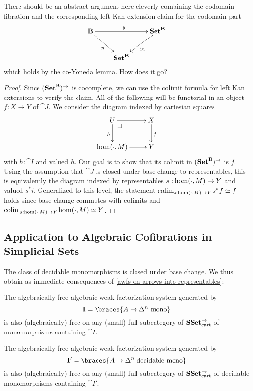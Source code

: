 \documentclass[reqno,10pt,a4paper,oneside]{amsart}
\begin{document}
\begin{question}
There should be an abstract argument here cleverly combining the codomain fibration and the corresponding left Kan extension claim for the codomain part
\[
\xymatrix{
  \cat{B}
  \ar[rr]^{y}
  \ar[dr]_{y}
&&
  \Set^{\cat{B}}
  \ar[dl]^{\id}
\\&
  \Set^{\cat{B}}
}
\]
which holds by the co-Yoneda lemma.
How does it go?
\end{question}

\begin{proof}
Since $(\mathbf{Set}^{\mathbf{B}})^{\to}$ is cocomplete, we can use the colimit formula for left Kan extensions to verify the claim.
All of the following will be functorial in an object $f : X \to Y$ of $\cat{J}$.
We consider the diagram indexed by cartesian squares
\[
\xymatrix{
  U
  \ar[r]
  \ar[d]_{h}
  \pullback{dr}
&
  X
  \ar[d]^{f}
\\
  \hom(\arghole, M)
  \ar[r]
&
  Y
}
\]
with $h : \cat{I}$ and valued $h$.
Our goal is to show that its colimit in $(\mathbf{Set}^{\mathbf{B}})^{\to}$ is $f$.
Using the assumption that $\cat{J}$ is closed under base change to representables, this is equivalently the diagram indexed by representables $s : \hom(\mathop{\cdot}, M) \to Y$ and valued $s^* i$.
Generalized to this level, the statement $\operatorname{colim}_{s : \hom(\mathop{\cdot}, M) \to Y} s^* f \simeq f$ holds since base change commutes with colimits and $\operatorname{colim}_{s : \hom(\mathop{\cdot}, M) \to Y} \hom(\mathop{\cdot}, M) \simeq Y$.
\end{proof}

\subsection{Application to Algebraic Cofibrations in Simplicial Sets}

The class of decidable monomorphisms is closed under base change.
We thus obtain as immediate consequences of \cref{awfs-on-arrows-into-representables}:

\begin{corollary}
\label{monos-into-representables}
The algebraically free algebraic weak factorization system generated by
\[\cat{I} = \braces{A \to \Delta^n\ \text{\normalfont{mono}}}\]
is also (algebraically) free on any (small) full subcategory of $\mathbf{SSet}_{\text{cart}}^{\to}$ of monomorphisms containing $\cat{I}$.
\end{corollary}

\begin{corollary}
\label{decidable-monos-into-representables}
The algebraically free algebraic weak factorization system generated by
\[\cat{I}' = \braces{A \to \Delta^n\ \text{\normalfont{decidable mono}}}\]
is also (algebraically) free on any (small) full subcategory of $\mathbf{SSet}_{\text{cart}}^{\to}$ of decidable monomorphisms containing $\cat{I}'$.
\end{corollary}
\end{document}
